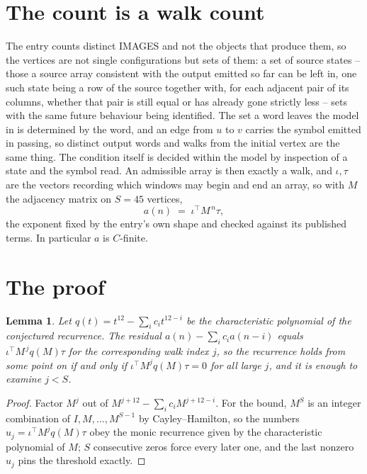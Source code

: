 \documentclass[11pt,a4paper]{article}
\theoremstyle{plain}
\newtheorem{lemma}[theorem]{Lemma}
\theoremstyle{definition}
\begin{document}
\section{The count is a walk count}

The entry counts distinct IMAGES and not the objects that produce them, so the vertices are not single configurations but sets of them: a set of source states -- those a source array consistent with the output emitted so far can be left in, one such state being a row of the source together with, for each adjacent pair of its columns, whether that pair is still equal or has already gone strictly less -- sets with the same future behaviour being identified. The set a word leaves the model in is determined by the word, and an edge from $u$ to $v$ carries the symbol emitted in passing, so distinct output words and walks from the initial vertex are the same thing. The condition itself is decided within the model by inspection of a state and the symbol read.
An admissible array is then exactly a walk, and $\iota,\tau$ are the vectors recording which windows may begin and end an array, so with $M$ the adjacency matrix on $S=45$ vertices,
\[
a(n)\;=\;\iota^{\!\top}M^{\,n}\tau ,
\]
the exponent fixed by the entry's own shape and checked against its published terms. In
particular $a$ is $C$-finite.

\section{The proof}

\begin{lemma}\label{lem:crit}
Let $q(t)=t^{12}-\sum_i c_it^{12-i}$ be the characteristic polynomial of the
conjectured recurrence. The residual $a(n)-\sum_ic_ia(n-i)$ equals
$\iota^{\!\top}M^{\,j}q(M)\tau$ for the corresponding walk index $j$, so the recurrence
holds from some point on if and only if $\iota^{\!\top}M^{j}q(M)\tau=0$ for all large $j$,
and it is enough to examine $j<S$.
\end{lemma}

\begin{proof}
Factor $M^{j}$ out of $M^{j+12}-\sum_ic_iM^{j+12-i}$. For the bound, $M^{S}$
is an integer combination of $I,M,\dots,M^{S-1}$ by Cayley--Hamilton, so the numbers
$u_j=\iota^{\!\top}M^{j}q(M)\tau$ obey the monic recurrence given by the characteristic
polynomial of $M$; $S$ consecutive zeros force every later one, and the last nonzero $u_j$
pins the threshold exactly.
\end{proof}
\end{document}
